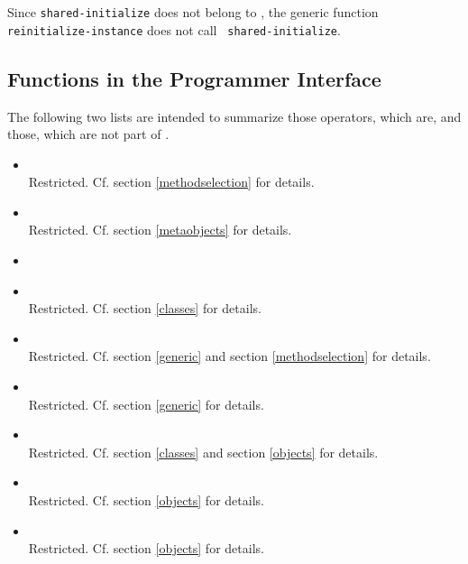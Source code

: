 Since {\tt shared-initialize} does not belong to , the generic 
function {\tt reinitialize-instance} does not call {\tt  
shared-initialize}.

\subsection{Functions in the Programmer Interface}
\label{functions}

The following two lists are intended to summarize those operators, which 
are, and those, which are not part of . 

\begin{itemize}

\item {} \\ 
Restricted. Cf. section \ref{methodselection} for details.

\item {} \\ 
Restricted. Cf. section \ref{metaobjects} for details.

\item {}

\item {} \\ 
Restricted. Cf. section \ref{classes} for details.

\item {} \\ 
Restricted. Cf. section \ref{generic} and section \ref{methodselection} for details.

\item {} \\ 
Restricted. Cf. section \ref{generic} for details.

\item {} \\ 
Restricted. Cf. section \ref{classes} and section \ref{objects} for details.

\item {} \\ 
Restricted. Cf. section \ref{objects} for details.

\item {} \\ 
Restricted. Cf. section \ref{objects} for details.


\end{itemize}
